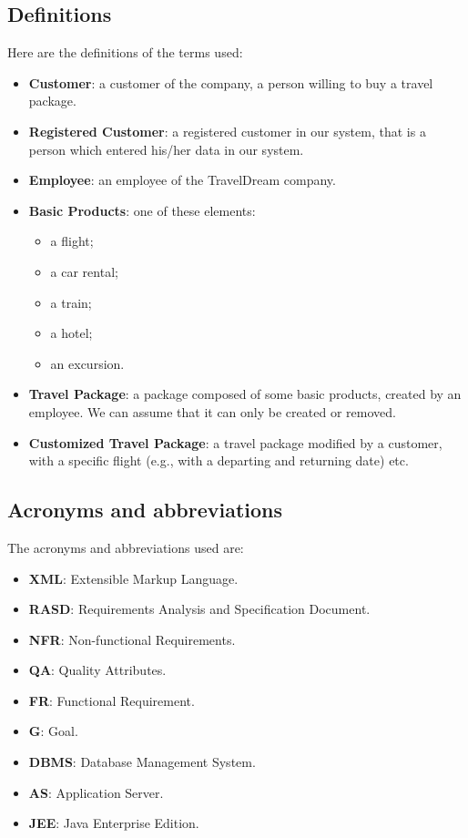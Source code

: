 \documentclass[a4paper,12pt]{book}
\begin{document}
\subsection{Definitions}
Here are the definitions of the terms used:
\begin{itemize}
  \item \textbf{Customer}: a customer of the company, a person willing to buy a travel package.
  \item \textbf{Registered Customer}: a registered customer in our system, that is a person which entered his/her data in our system.
  \item \textbf{Employee}: an employee of the TravelDream company.
  \item \textbf{Basic Products}: one of these elements:
  \begin{itemize}
    \item a flight;
    \item a car rental;
    \item a train;
    \item a hotel;
    \item an excursion.
  \end{itemize}
  \item \textbf{Travel Package}: a package composed of some basic products, created by an employee. We can assume that it can only be created or removed.
  \item \textbf{Customized Travel Package}: a travel package modified by a customer, with a specific flight (e.g., with a departing and returning date) etc.
\end{itemize}

\subsection{Acronyms and abbreviations}
The acronyms and abbreviations used are:
\begin{itemize}
  \item \textbf{XML}: Extensible Markup Language.
  \item \textbf{RASD}: Requirements Analysis and Specification Document.
  \item \textbf{NFR}: Non-functional Requirements.
  \item \textbf{QA}: Quality Attributes.
  \item \textbf{FR}: Functional Requirement.
  \item \textbf{G}: Goal.
  \item \textbf{DBMS}: Database Management System.
  \item \textbf{AS}: Application Server.
  \item \textbf{JEE}: Java Enterprise Edition.
\end{itemize}
\end{document}
